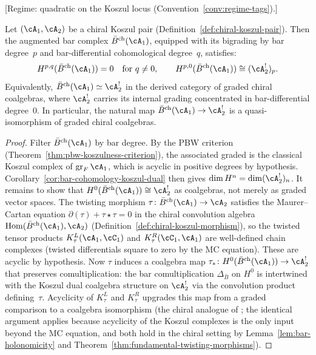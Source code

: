 \begin{theorem}
\label{thm:bar-concentration}
\textup{[Regime: quadratic on the Koszul locus
\textup{(}Convention~\textup{\ref{conv:regime-tags})}.]}

Let $(\cA_1, \cA_2)$ be a chiral Koszul pair
\textup{(}Definition~\textup{\ref{def:chiral-koszul-pair})}.
Then the augmented bar complex $\bar{B}^{\mathrm{ch}}(\cA_1)$,
equipped with its bigrading by bar degree~$p$ and bar-differential
cohomological degree~$q$, satisfies:
\[
H^{p,q}(\bar{B}^{\mathrm{ch}}(\cA_1)) = 0
\quad\text{for } q \neq 0,
\qquad
H^{p,0}(\bar{B}^{\mathrm{ch}}(\cA_1)) \cong (\cA_2^!)_p.
\]
Equivalently, $\bar{B}^{\mathrm{ch}}(\cA_1) \simeq \cA_2^!$ in the
derived category of graded chiral coalgebras, where $\cA_2^!$ carries
its internal grading concentrated in bar-differential degree~$0$.
In particular, the natural map
$\bar{B}^{\mathrm{ch}}(\cA_1) \to \cA_2^!$ is a
quasi-isomorphism of graded chiral coalgebras.
\end{theorem}

\begin{proof}
Filter $\bar{B}^{\mathrm{ch}}(\cA_1)$ by bar degree.
By the PBW criterion (Theorem~\ref{thm:pbw-koszulness-criterion}),
the associated graded is the classical Koszul complex of
$\operatorname{gr}_F \cA_1$, which is acyclic in positive
degrees by hypothesis.
Corollary~\ref{cor:bar-cohomology-koszul-dual} then gives
$\dim H^n = \dim (\cA_2^!)_n$.
It remains to show that $H^0(\bar{B}^{\mathrm{ch}}(\cA_1))
\cong \cA_2^!$ as coalgebras, not merely as graded vector spaces.
The twisting morphism
$\tau\colon \bar{B}^{\mathrm{ch}}(\cA_1) \to \cA_2$
satisfies the Maurer--Cartan equation $\partial(\tau) + \tau \star \tau = 0$
in the chiral convolution algebra
$\mathrm{Hom}(\bar{B}^{\mathrm{ch}}(\cA_1), \cA_2)$
(Definition~\ref{def:chiral-koszul-morphism}), so the
twisted tensor products
$K_\tau^L(\cA_1, \cC_1)$ and $K_\tau^R(\cC_1, \cA_1)$
are well-defined chain complexes (twisted differentials square to
zero by the MC equation).
These are acyclic by hypothesis.
Now $\tau$ induces a coalgebra map
$\tau_* \colon H^0(\bar{B}^{\mathrm{ch}}(\cA_1)) \to \cA_2^!$
that preserves comultiplication: the bar comultiplication
$\Delta_{\bar{B}}$ on $H^0$ is intertwined with the Koszul dual
coalgebra structure on $\cA_2^!$ via the convolution product
defining~$\tau$.
Acyclicity of $K_\tau^L$ and $K_\tau^R$ upgrades this map from a
graded comparison to a coalgebra isomorphism
(the chiral analogue of \cite[Theorem~2.3.1]{LV12}; the
identical argument applies because acyclicity of the Koszul
complexes is the only input beyond the MC equation, and both
hold in the chiral setting by
Lemma~\ref{lem:bar-holonomicity} and
Theorem~\ref{thm:fundamental-twisting-morphisms}).
\end{proof}


